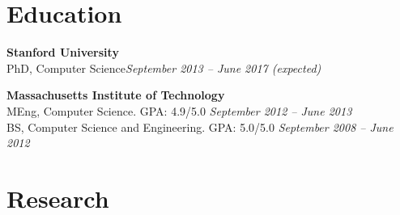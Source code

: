\documentclass[margin,line]{resume}
\begin{document}
\vspace{-5.0mm}

\begin{resume}

\section{\mysidestyle Education}

\textbf{Stanford University} \vspace{0mm}\\\vspace{0mm}%
PhD, Computer Science\hfill \textsl{September 2013 -- June 2017 (expected)}

\textbf{Massachusetts Institute of Technology} \vspace{0mm}\\\vspace{0mm}%
MEng, Computer Science. GPA: 4.9/5.0 \hfill \textsl{September 2012 -- June 2013}\\\vspace{1mm}%
BS, Computer Science and Engineering. GPA: 5.0/5.0 \hfill \textsl{September 2008 -- June 2012}\vspace{-0.8mm}

\vspace{-0.5mm}

\section{\mysidestyle Research}


\end{resume}
\end{document}

